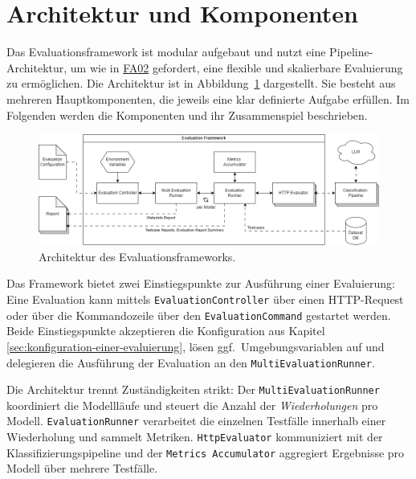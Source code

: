 \section{Architektur und Komponenten}\label{sec:architektur-und-komponenten}

Das Evaluationsframework ist modular aufgebaut und nutzt eine Pipeline-Architektur, um wie in \hyperlink{FA02}{FA02} gefordert, eine flexible und skalierbare Evaluierung zu ermöglichen. Die Architektur ist in Abbildung~\ref{fig:evaluation-framework-architecture} dargestellt. Sie besteht aus mehreren Hauptkomponenten, die jeweils eine klar definierte Aufgabe erfüllen. Im Folgenden werden die Komponenten und ihr Zusammenspiel beschrieben.

\begin{figure}[h]
    \centering
    \includegraphics[width=\linewidth]{images/evaluation/evaluation-framework-architecture.drawio}
    \caption{Architektur des Evaluationsframeworks.}
    \label{fig:evaluation-framework-architecture}
\end{figure}

Das Framework bietet zwei Einstiegspunkte zur Ausführung einer Evaluierung: Eine Evaluation kann mittels \texttt{EvaluationController} über einen HTTP-Request oder über die Kommandozeile über den \texttt{EvaluationCommand} gestartet werden. Beide Einstiegspunkte akzeptieren die Konfiguration aus Kapitel \ref{sec:konfiguration-einer-evaluierung}, lösen ggf.\ Umgebungsvariablen auf und delegieren die Ausführung der Evaluation an den \texttt{MultiEvaluationRunner}.

Die Architektur trennt Zuständigkeiten strikt: Der \texttt{MultiEvaluationRunner} koordiniert die Modellläufe und steuert die Anzahl der \emph{Wiederholungen} pro Modell. \texttt{EvaluationRunner} verarbeitet die einzelnen Testfälle innerhalb einer Wiederholung und sammelt Metriken. \texttt{HttpEvaluator} kommuniziert mit der Klassifizierungspipeline und der \texttt{Metrics Accumulator} aggregiert Ergebnisse pro Modell über mehrere Testfälle.